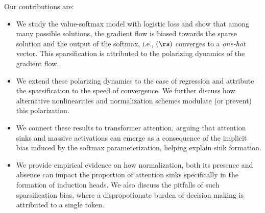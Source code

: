 \documentclass{article}
\theoremstyle{plain}
\theoremstyle{definition}
\theoremstyle{remark}
\begin{document}

Our contributions are:
\begin{itemize}[noitemsep, topsep=1pt]
\item We study the value-softmax model with logistic loss and show that among many possible solutions, the gradient flow is biased towards the sparse solution and the output of the softmax, i.e., $\sf(\aa)$ converges to a \emph{one-hot} vector. This sparsification is attributed to the polarizing dynamics of the gradient flow.
%
\item We extend these polarizing dynamics to the case of regression and attribute the sparsification to the speed of convergence. We further discuss how alternative nonlinearities and normalization schemes modulate (or prevent) this polarization.
%
\item We connect these results to transformer attention, arguing that attention sinks and massive activations can emerge as a consequence of the implicit bias induced by the softmax parameterization, helping explain sink formation.%
%
\item We provide empirical evidence on how normalization, both its presence and absence can impact the proportion of attention sinks specifically in the formation of induction heads. We also discuss the pitfalls of such sparsification bias, where a dispropotionate burden of decision making is attributed to a single token.
\end{itemize}
\end{document}
